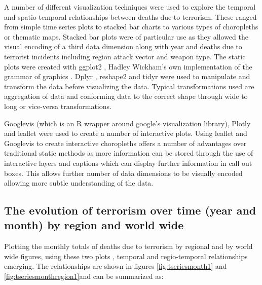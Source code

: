 A number of different visualization techniques were used to explore the temporal and spatio temporal relationships between deaths due to terrorism.  These ranged from simple time series plots to stacked bar charts to various types of choropleths or thematic maps. Stacked bar plots were of particular use as they allowed the visual encoding of a third data dimension along with year and deaths due to terrorist incidents including region attack vector and weapon type. The static plots were created with ggplot2 \citep{ggplotwickham2009}, Hadley Wickham's own implementation of the grammar of graphics \citep{wilkinson2006grammar}. Dplyr \citep{dplyr2016wickham}, reshape2 \citep{reshape2007wickham} and tidyr \citep{tidyr2916Wickham} were used to manipulate and transform the data before visualizing the data. Typical transformations used are aggregation of data and conforming data to the correct shape through wide to long or vice-versa transformations.

Googlevis (which is an R wrapper around google's visualization library), Plotly \citep{plotlymanual2016} and leaflet \citep{leaflet2016} were used to create a number of interactive plots. Using leaflet and Googlevis to create interactive choropleths offers a number of advantages over traditional static methods as more information can be stored through the use of interactive layers and captions which can display further information in call out boxes. This allows further number of data dimensions to be visually encoded allowing more subtle understanding of the data.

\subsection{The evolution of terrorism over time (year and month) by
region and world wide}\label{sec:evteryearmonth}

Plotting the monthly totals of deaths due to terrorism by regional and by world wide figures,  using these two plots , temporal and regio-temporal relationships emerging. The relationships are shown in figures \ref{fig:tseriesmonth1} and \ref{fig:tseriesmonthregion1}and can be summarized as:

